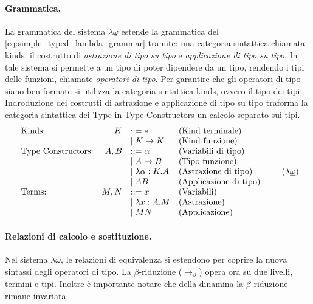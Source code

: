 \paragraph{Grammatica.}
La grammatica del sistema $\lambda\underline{\omega}$ estende la grammatica del \ref{eq:simple_typed_lambda_grammar} tramite: una categoria sintattica chiamata kinds,  
il costrutto di \emph{astrazione di tipo su tipo} e \emph{applicazione di tipo su tipo}. In tale sistema si permette a un tipo di poter dipendere da un tipo, rendendo
i tipi delle funzioni, chiamate \emph{operatori di tipo}. Per garantire che gli operatori di tipo siano ben formate si utilizza la categoria sintattica kinds, ovvero 
il tipo dei tipi. Indroduzione dei costrutti di astrazione e applicazione di tipo su tipo traforma la categoria sintattica dei Type in Type Constructors un calcolo separato
sui tipi.
\begin{equation}
    \begin{array}{lrll}
        \text{Kinds:}               & K           & ::= \ast                & \text{(Kind terminale)}       \\
                                    &             & \mid K \to K            & \text{(Kind funzione)}        \\
        \text{Type Constructors:}   & A, B        & ::= \alpha              & \text{(Variabili di tipo)}    \\
                                    &             & \mid A \to B            & \text{(Tipo funzione)}        \\
                                    &             & \mid \lambda \alpha:K.A & \text{(Astrazione di tipo)}   \\
                                    &             & \mid A B                & \text{(Applicazione di tipo)} \\
        \text{Terms:}               & M, N        & ::= x                   & \text{(Variabili)}            \\
                                    &             & \mid \lambda x:A. M     & \text{(Astrazione)}           \\
                                    &             & \mid M N                & \text{(Applicazione)}
        \end{array}
    \tag{$\lambda\underline{\omega}$}
    \label{eq:grammar_system_omega_under}
\end{equation}

\paragraph{Relazioni di calcolo e sostituzione.}
Nel sistema $\lambda\underline{\omega}$, le relazioni di equivalenza si estendono per coprire la nuova sintassi degli operatori di tipo. 
La $\beta$-riduzione ($\to_\beta$) opera ora su due livelli, termini e tipi. Inoltre è importante notare che della dinamina la $\beta$-riduzione 
rimane invariata.

